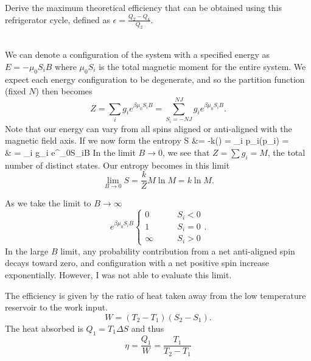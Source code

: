 \documentclass[10pt,letterpaper]{article}
\begin{document}
	\item
	Derive the maximum theoretical efficiency that can be obtained using this refrigerator cycle, defined 
	as $\epsilon = \frac{Q_2-Q_4}{Q_2}$. 
	\\ \\
	\eenum
	
	\benum
	\item
	We can denote a configuration of the system with a specified energy as $E = -\mu_0 S_i B$ where 
	$\mu_0S_i$ is the total magnetic moment for the entire system. We expect each energy configuration
	to be degenerate, and so the partition function (fixed $N$) then becomes
	\[
		Z = \sum_i g_i e^{\beta\mu_0 S_i B} = \sum_{S_i=-NJ}^{NJ} g_i e^{\beta \mu_0 S_i B}.
	\]
	Note that our energy can vary from all spins aligned or anti-aligned with the magnetic field axis. If we
	now form the entropy
	\ba
		S &= -k\tr(\rho\ln\rho) = \sum_i p_i\ln(p_i) = \\
		& = \sum_i g_i e^{\beta\mu_0S_iB} 
	\ea
	In the limit $B\to 0$, we see that $Z = \sum g_i = M$, the total number of distinct states. Our entropy
	becomes in this limit
	\[
		\lim_{B\to 0}S = \frac{k}{Z}M\ln M = k\ln M.
	\]
	
	\item
	As we take the limit to $B\to \infty$
	\[
		e^{\beta\mu_0S_iB} \begin{cases} 0&\qquad S_i < 0 \\ 1&\qquad S_i = 0 \\ \infty &\qquad S_i >0
		\end{cases}.
	\]
	In the large $B$ limit, any probability contribution from a net anti-aligned spin decays toward zero, 
	and configuration with a net positive spin increase exponentially. However, I was not able to evaluate this
	limit. 
	
	\item
	
	\item
	The efficiency is given by the ratio of heat taken away from the low temperature reservoir to the 
	work input.
	\[
		W = (T_2-T_1)(S_2-S_1).
	\]
	The heat absorbed is $Q_1 = T_1\Delta S$
	and thus
	\[
		\eta = \frac{Q_1}{W} = \frac{T_1}{T_2-T_1}
	\]
	\eenum
	\eenum
\end{document}
